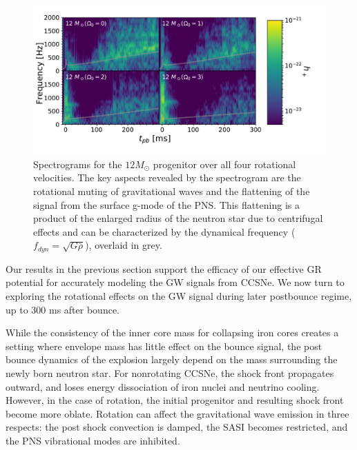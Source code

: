 \documentclass[twocolumn,times]{aastex62}  %
\begin{document}
\begin{figure}[t]
    \centering
    \includegraphics[scale=0.38]{figures/gws_2x2_line_M1.pdf}
    \caption{Spectrograms for the $12 M_\odot$ progenitor over all four rotational velocities.  The key aspects revealed by the spectrogram are the rotational muting of gravitational waves and the flattening of the signal from the surface g-mode of the PNS.  This flattening is a product of the enlarged radius of the neutron star due to centrifugal effects and can be characterized by the dynamical frequency ($f_{dyn} = \sqrt{G \overline{\rho}}$), overlaid in grey.}
    \label{fig:2x2}
\end{figure}

Our results in the previous section support the efficacy of our effective GR potential for accurately modeling the GW signals from CCSNe.
We now turn to exploring the rotational effects on the GW signal during later postbounce regime, up to 300 ms after bounce.


While the consistency of the inner core mass for collapsing iron cores creates a setting where envelope mass has little effect on the bounce signal, the post bounce dynamics of the explosion largely depend on the mass surrounding the newly born neutron star.  For nonrotating CCSNe, the shock front propagates outward, and loses energy dissociation of iron nuclei and neutrino cooling.  However, in the case of rotation, the initial progenitor and resulting shock front become more oblate.  Rotation can affect the gravitational wave emission in three respects: the post shock convection is damped, the SASI becomes restricted, and the PNS vibrational modes are inhibited. 
\end{document}
